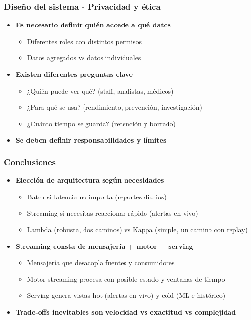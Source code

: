 \documentclass[aspectratio=169]{beamer}
\begin{document}
\begin{frame}
\frametitle{Diseño del sistema - Privacidad y ética}
\begin{itemize}
  \item \textbf{Es necesario definir quién accede a qué datos}
  \begin{itemize}
    \item Diferentes roles con distintos permisos
    \item Datos agregados vs datos individuales
  \end{itemize}

  \vspace{1em}

  \item \textbf{Existen diferentes preguntas clave}
  \begin{itemize}
    \item ¿Quién puede ver qué? (staff, analistas, médicos)
    \item ¿Para qué se usa? (rendimiento, prevención, investigación)
    \item ¿Cuánto tiempo se guarda? (retención y borrado)
  \end{itemize}

  \vspace{1em}
  \item \textbf{Se deben definir responsabilidades y límites}
\end{itemize}
\end{frame}

\begin{frame}
\frametitle{Conclusiones}
\begin{itemize}
  \item \textbf{Elección de arquitectura según necesidades}
  \begin{itemize}
    \item Batch si latencia no importa (reportes diarios)
    \item Streaming si necesitas reaccionar rápido (alertas en vivo)
    \item Lambda (robusta, dos caminos) vs Kappa (simple, un camino con replay)
  \end{itemize}

  \vspace{1em}

  \item \textbf{Streaming consta de mensajería + motor + serving}
  \begin{itemize}
    \item Mensajería que desacopla fuentes y consumidores
    \item Motor streaming procesa con posible estado y ventanas de tiempo
    \item Serving genera vistas hot (alertas en vivo) y cold (ML e histórico)
  \end{itemize}

  \vspace{1em}

  \item \textbf{Trade-offs inevitables son velocidad vs exactitud vs complejidad}
\end{itemize}
\end{frame}
\end{document}
